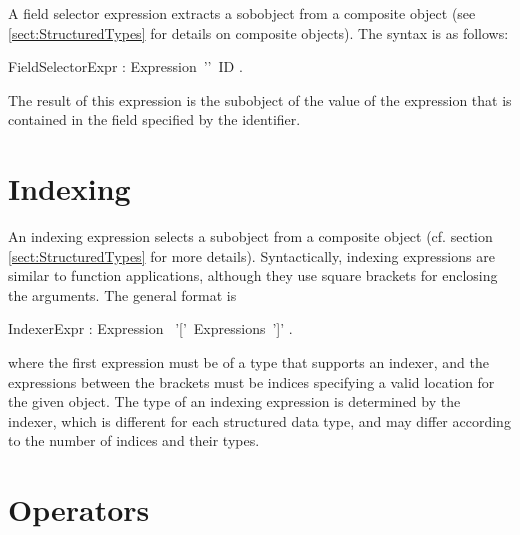 A field selector expression extracts a sobobject from a composite
object (see \ref{sect:StructuredTypes} for details on composite
objects). The syntax is as follows:


\bgr
  FieldSelectorExpr : Expression~'\charDot'~ID .
\egr

The result of this expression is the subobject of the value of the
expression that is contained in the field specified by the identifier.



\section{Indexing}\label{sect:Indexing}

An indexing expression selects a subobject from a composite object
(cf. section \ref{sect:StructuredTypes} for more details).
Syntactically, indexing expressions are similar to function
applications, although they use square brackets for enclosing the
arguments. The general format is


\bgr
   IndexerExpr : Expression ~'['~Expressions~']' .
\egr

where the first expression must be of a type that supports an indexer,
and the expressions between the brackets must be indices specifying a
valid location for the given object. The type of an indexing
expression is determined by the indexer, which is different for each
structured data type, and may differ according to the number of
indices and their types.



\section{Operators}\label{sect:Operators}

  
 
 

